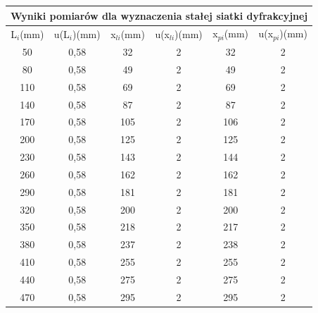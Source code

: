 \documentclass[12pt]{article}
\begin{document}
\begin{table}[!htbp]
    \centering
    \begin{adjustbox}{width=1\textwidth}
    \begin{tabular}{|c|c|c|c|c|c|}
    \hline
    \multicolumn{6}{|c|}{Wyniki pomiarów dla wyznaczenia stałej siatki dyfrakcyjnej} \\
    \hline
        L$_i$(mm) & u(L$_i$)(mm) & x$_{li}$(mm) & u(x$_{li}$)(mm) & x$_{pi}$(mm) & u(x$_{pi}$)(mm) \\ \hline
        50 & 0,58 & 32 & 2 & 32 & 2 \\ \hline
        80 & 0,58 & 49 & 2 & 49 & 2 \\ \hline
        110 & 0,58 & 69 & 2 & 69 & 2 \\ \hline
        140 & 0,58 & 87 & 2 & 87 & 2 \\ \hline
        170 & 0,58 & 105 & 2 & 106 & 2 \\ \hline
        200 & 0,58 & 125 & 2 & 125 & 2 \\ \hline
        230 & 0,58 & 143 & 2 & 144 & 2 \\ \hline
        260 & 0,58 & 162 & 2 & 162 & 2 \\ \hline
        290 & 0,58 & 181 & 2 & 181 & 2 \\ \hline
        320 & 0,58 & 200 & 2 & 200 & 2 \\ \hline
        350 & 0,58 & 218 & 2 & 217 & 2 \\ \hline
        380 & 0,58 & 237 & 2 & 238 & 2 \\ \hline
        410 & 0,58 & 255 & 2 & 255 & 2 \\ \hline
        440 & 0,58 & 275 & 2 & 275 & 2 \\ \hline
        470 & 0,58 & 295 & 2 & 295 & 2 \\ \hline
    \end{tabular}
\end{adjustbox}
\end{table}
\end{document}
